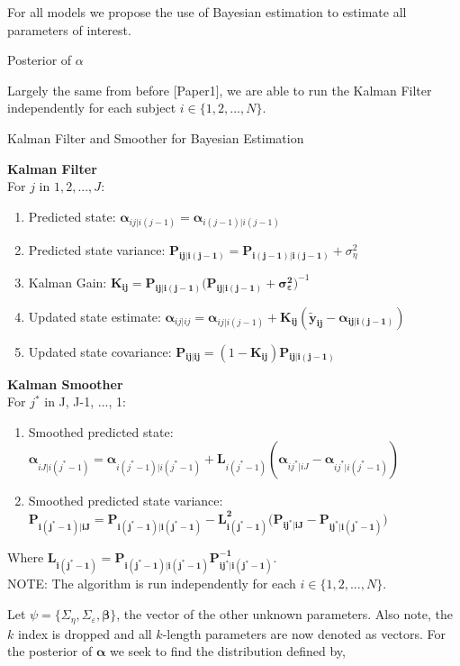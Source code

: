 \documentclass[
]{article}
\begin{document}
For all models we propose the use of Bayesian estimation to estimate all parameters of interest.

Posterior of \(\alpha\)

Largely the same from before {[}Paper1{]}, we are able to run the Kalman Filter independently for each subject \(i \in \{1, 2, ..., N\}\).

\begin{algorithm}
\caption{Kalman Filter and Smoother for Bayesian Estimation}\label{alg:bkfks}
\textbf{Kalman Filter}\\ 
For $j$ in $1, 2, ..., J$:
\begin{enumerate}
  \item {Predicted state:} $\boldsymbol{\alpha}_{ij|i(j-1)} = \boldsymbol{\alpha}_{i(j-1)|i(j-1)}$
  \item {Predicted state variance:} $\boldsymbol{P_{ij|i(j-1)} = P_{i(j-1)|i(j-1)}} + \sigma^2_\eta$
  \item {Kalman Gain:} $\boldsymbol{K_{ij}} = \boldsymbol{\boldsymbol{P}_{ij|i(j-1)}(\boldsymbol{P}_{ij|i(j-1)} + \sigma^2_\varepsilon})^{-1}$
  \item {Updated state estimate:} $\boldsymbol{\alpha}_{ij|ij} = \boldsymbol{\alpha}_{ij|i(j-1)} + \boldsymbol{K_{ij}} (\boldsymbol{\tilde y_{ij}- \alpha_{ij|i(j-1)}})$
  \item {Updated state covariance:} $\boldsymbol{P_{ij|ij}} = (1-\boldsymbol{K_{ij}})\boldsymbol{P_{ij|i(j-1)}}$
\end{enumerate}
\textbf{Kalman Smoother}\\  
For $j^*$ in J, J-1, ..., 1:
\begin{enumerate}
  \item Smoothed predicted state:  $\boldsymbol{\alpha}_{iJ|i(j^*-1)} =\boldsymbol{\alpha}_{i(j^*-1)|i(j^*-1)} + \boldsymbol{L}_{i(j^*-1)} (\boldsymbol{\alpha}_{ij^*|iJ} - \boldsymbol{\alpha}_{ij^*|i(j^*-1)})$
  \item Smoothed predicted state variance:  $\boldsymbol{P_{i(j^*-1)|iJ}} = \boldsymbol{P_{i(j^*-1)|i(j^*-1)}} - \boldsymbol{L_{i(j^*-1)}^2 (P_{ij^*|iJ} -P_{ij^*|i(j^*-1)}})$
\end{enumerate}
Where $\boldsymbol{L_{i(j^*-1)} = P_{{i(j^*-1)}|{i(j^*-1)}}  P^{-1}_{ij^*|i(j^*-1)}}$.\\
NOTE: The algorithm is run independently for each $i \in \{1, 2, ..., N\}$.
\end{algorithm}

Let \(\psi = \{\Sigma_\eta, \Sigma_\varepsilon, \boldsymbol{\beta}\}\), the vector of the other unknown parameters. Also note, the \(k\) index is dropped and all \(k\)-length parameters are now denoted as vectors. For the posterior of \(\boldsymbol{\alpha}\) we seek to find the distribution defined by,
\end{document}
